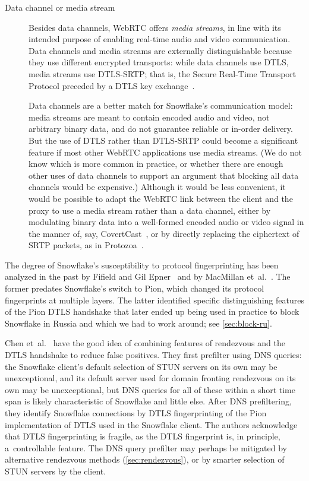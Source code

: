 \documentclass[letterpaper,twocolumn]{article}
\newcommand{\firstterm}[1]{\textit{#1}}
\begin{document}
\begin{description}
\item[Data channel or media stream]
Besides data channels, WebRTC offers \firstterm{media streams},
in line with its intended purpose of enabling real-time
audio and video communication.
Data channels and media streams are externally distinguishable
because they use different encrypted transports:
while data channels use DTLS,
media streams use DTLS-SRTP;
that is, the Secure Real-Time Transport Protocol
preceded by a DTLS key exchange~\cite[\S 4.3]{rfc8827}.

Data channels are a better match for Snowflake's communication model:
media streams are meant to contain encoded audio and video,
not arbitrary binary data,
and do not guarantee reliable or in-order delivery.
But the use of DTLS rather than DTLS-SRTP could become
a significant feature if most other WebRTC applications use media streams.
(We do not know which is more common in practice,
or whether there are enough other uses of data channels
to support an argument that blocking all data channels would be expensive.)
Although it would be less convenient,
it would be possible to adapt the WebRTC link between
the client and the proxy
to use a media stream rather than a data channel,
either by modulating binary data into a well-formed encoded
audio or video signal in the manner of, say,
CovertCast~\cite[\S 4.3]{McPherson2016a},
or by directly replacing the ciphertext of SRTP packets,
as in Protozoa~\cite[\S 4.4]{Barradas2020a}.

\end{description}

The degree of Snowflake's susceptibility to protocol fingerprinting
has been analyzed in the past by
Fifield and Gil Epner~\cite{arxiv.1605.08805} and by
MacMillan et~al.~\cite{arxiv.2008.03254}.
The former predates Snowflake's switch to Pion,
which changed its protocol fingerprints at multiple layers.
The latter identified specific distinguishing features
of the Pion DTLS handshake
that later ended up being used in practice
to block Snowflake in Russia
and which we had to work around;
see \autoref{sec:block-ru}.

Chen et~al.~\cite{Chen2023a}
have the good idea of combining features
of rendezvous and the DTLS handshake
to reduce false positives.
They first prefilter using DNS queries:
the Snowflake client's default selection of STUN servers
on its own may be unexceptional,
and its default server used for domain fronting rendezvous
on its own may be unexceptional,
but DNS queries for all of these within a short time span
is likely characteristic of Snowflake and little else.
After DNS prefiltering, they identify Snowflake connections
by DTLS fingerprinting of the Pion implementation of DTLS
used in the Snowflake client.
The authors acknowledge that DTLS fingerprinting
is fragile, as the DTLS fingerprint is, in principle,
a~controllable feature.
The DNS query prefilter may perhaps be mitigated
by alternative rendezvous methods (\autoref{sec:rendezvous}),
or by smarter selection of STUN servers by the client.
\end{document}
